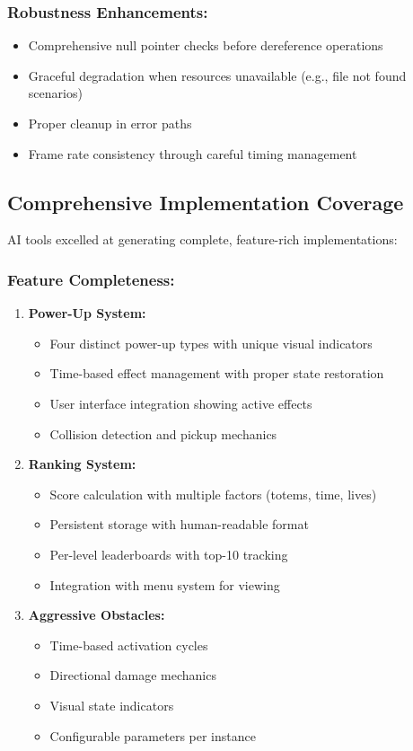 \documentclass[12pt,a4paper]{article}
\begin{document}
\subsubsection*{Robustness Enhancements:}
\begin{itemize}
    \item Comprehensive null pointer checks before dereference operations
    \item Graceful degradation when resources unavailable (e.g., file not found scenarios)
    \item Proper cleanup in error paths
    \item Frame rate consistency through careful timing management
\end{itemize}

\subsection{Comprehensive Implementation Coverage}

AI tools excelled at generating complete, feature-rich implementations:

\subsubsection*{Feature Completeness:}
\begin{enumerate}
    \item \textbf{Power-Up System:}
    \begin{itemize}
        \item Four distinct power-up types with unique visual indicators
        \item Time-based effect management with proper state restoration
        \item User interface integration showing active effects
        \item Collision detection and pickup mechanics
    \end{itemize}
    
    \item \textbf{Ranking System:}
    \begin{itemize}
        \item Score calculation with multiple factors (totems, time, lives)
        \item Persistent storage with human-readable format
        \item Per-level leaderboards with top-10 tracking
        \item Integration with menu system for viewing
    \end{itemize}
    
    \item \textbf{Aggressive Obstacles:}
    \begin{itemize}
        \item Time-based activation cycles
        \item Directional damage mechanics
        \item Visual state indicators
        \item Configurable parameters per instance
    \end{itemize}
\end{enumerate}
\end{document}
